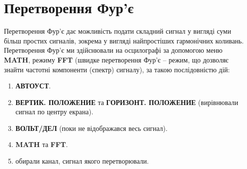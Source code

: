 \section{Перетворення Фур'є}
Перетворення Фур’є дає можливість подати складний сигнал у вигляді суми більш простих сигналів, зокрема у вигляді найпростіших гармонічних коливань. Перетворення Фур’є ми здійснювали на осцилографі за допомогою меню \textbf{MATH}, режиму \textbf{FFT} (швидке перетворення Фур'є – режим, що дозволяє знайти частотні компоненти (спектр) сигналу), за такою послідовністю дій:

\begin{enumerate}
    \item \textbf{АВТОУСТ}.
    \item \textbf{ВЕРТИК. ПОЛОЖЕНИЕ} та \textbf{ГОРИЗОНТ. ПОЛОЖЕНИЕ} (вирівнювали сигнал по центру екрана).
    \item \textbf{ВОЛЬТ/ДЕЛ} (поки не відображався весь сигнал).
    \item \textbf{MATH} та \textbf{FFT}.
    \item обирали канал, сигнал якого перетворювали.
\end{enumerate}

